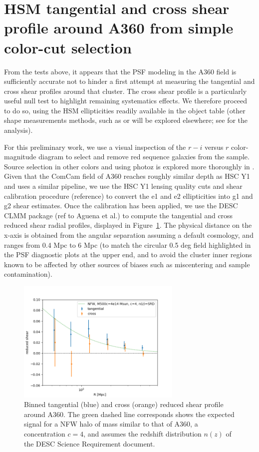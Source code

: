 \documentclass[SE,lsstdraft,authoryear,toc]{lsstdoc}
\begin{document}
\section{HSM tangential and cross shear profile around A360 from simple color-cut selection}
\label{sec:shear_profile}

From the tests above, it appears that the PSF modeling in the A360 field is sufficiently accurate not to hinder a first attempt at measuring the tangential and cross shear profiles around that cluster. The cross shear profile is a particularly useful null test to highlight remaining systematics effects. We therefore proceed to do so, using the HSM ellipticities readily available in the object table (other shape measurements methods, such as  or  will be explored elsewhere; see \citet{SITCOMTN-162} for the  analysis). 

For this preliminary work, we use a visual inspection of the $r-i$ versus $r$ color-magnitude diagram to select and remove red sequence galaxies from the sample. Source selection in other colors and using photoz is explored more thoroughly in \citet{SITCOMTN-163}. 
Given that the ComCam field of A360 reaches roughly similar depth as HSC Y1 and uses a similar pipeline, we use the HSC Y1 lensing quality cuts and shear calibration procedure (reference) to convert the e1 and e2 ellipticities into g1 and g2 shear estimates. Once the calibration has been applied, we use the DESC CLMM package (ref to Aguena et al.) to compute the tangential and cross reduced shear radial profiles, displayed in Figure~\ref{fig:shear_profile}. The physical distance on the x-axis is obtained from the angular separation assuming a default cosmology, and ranges from 0.4 Mpc to 6 Mpc (to match the circular 0.5 deg field highlighted in the PSF diagnostic plots at the upper end, and to avoid the cluster inner regions known to be affected by other sources of biases such as miscentering and sample contamination). 

\begin{figure}
\centering
\includegraphics[width=0.7\textwidth]{Figures/shear_profile.png}
\caption{Binned tangential (blue) and cross (orange) reduced shear profile around A360. The green dashed line corresponds shows the expected signal for a NFW halo of mass similar to that of A360, a concentration $c=4$, and assumes the redshift distribution $n(z)$ of the DESC Science Requirement document. \label{fig:shear_profile}}
\end{figure}
\end{document}
